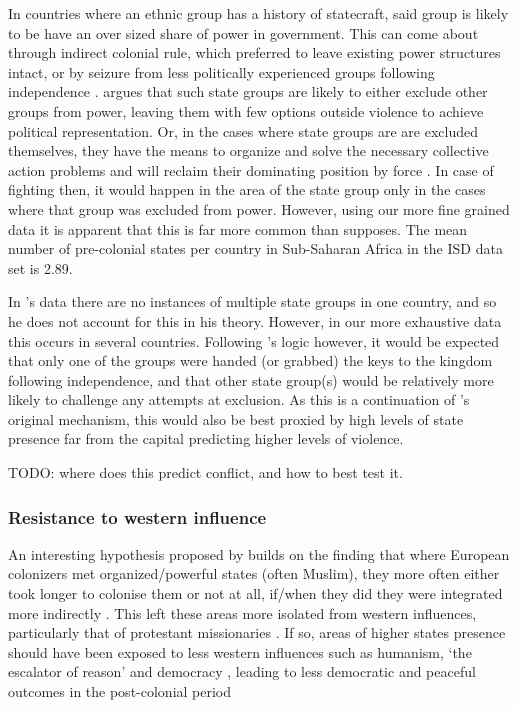 \documentclass[12pt]{article}
\begin{document}
\begin{multicols}{2}
In countries where an ethnic group has a history of statecraft, said group is
likely to be have an over sized share of power in government. This can come
about through indirect colonial rule, which preferred to leave existing power
structures intact, or by seizure from less politically experienced groups
following independence \citep{Paine2019}. \citet{Paine2019} argues that such
state groups are likely to either exclude other groups from power, leaving them
with few options outside violence to achieve political representation. Or, in
the cases where state groups are are excluded themselves, they have the means to
organize and solve the necessary collective action problems and will reclaim
their dominating position by force \citep{Paine2019}. In case of fighting then,
it would happen in the area of the state group only in the cases where that
group was excluded from power. However, using our more fine grained data it is
apparent that this is far more common than \citet{Paine2019} supposes. The mean
number of pre-colonial states per country in Sub-Saharan Africa in the ISD data
set is 2.89. 


In \citet{Paine2019}'s data there are no instances of multiple state groups in
one country, and so he does not account for this in his theory. However, in our
more exhaustive data this occurs in several countries. Following
\citet{Paine2019}'s logic however, it would be expected that only one of the
groups were handed (or grabbed) the keys to the kingdom following independence,
and that other state group(s) would be relatively more likely to challenge any
attempts at exclusion.  As this is a continuation of \citet{Paine2019}'s
original mechanism, this would also be best proxied by high levels of state
presence far from the capital predicting higher levels of violence.

TODO: where does this predict conflict, and how to best test it. 

\subsubsection{Resistance to western influence}

An interesting hypothesis proposed by \citet{Wishman} builds on the finding that
where European colonizers met organized/powerful states (often Muslim), they
more often either took longer to colonise them or not at all, if/when they did
they were integrated more indirectly \citep{Gerring2011, Hariri2012,
Englebert2000}. This left these areas more isolated from western influences,
particularly that of protestant missionaries \citep{Woodberry2012}. If so, areas
of higher states presence should have been exposed to less western influences
such as humanism, `the escalator of reason' \citep{Pinker2012} and democracy
\citep{Woodberry2012, Hariri2012}, leading to less democratic and peaceful
outcomes in the post-colonial period \citep{Hegre2006}


\end{multicols}
\end{document}
